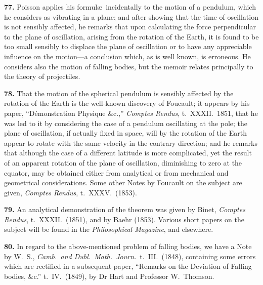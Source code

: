 \documentclass[11pt,a4paper]{article}
\theoremstyle{definition}
\begin{document}
\textbf{77.} Poisson applies his formul\ae\ incidentally to the motion of a pendulum, which he considers as vibrating in a plane; and after showing that the time of oscillation is not sensibly affected, he remarks that upon calculating the force perpendicular to the plane of oscillation, arising from the rotation of the Earth, it is found to be too small sensibly to displace the plane of oscillation or to have any appreciable influence on the motion---a conclusion which, as is well known, is erroneous. He considers also the motion of falling bodies, but the memoir relates principally to the theory of projectiles.

\textbf{78.} That the motion of the spherical pendulum is sensibly affected by the rotation of the Earth is the well-known discovery of Foucault; it appears by his paper, ``D\'emonstration Physique \&c.,'' \textit{Comptes Rendus}, t.~XXXII.~1851, that he was led to it by considering the case of a pendulum oscillating at the pole; the plane of oscillation, if actually fixed in space, will by the rotation of the Earth appear to rotate with the same velocity in the contrary direction; and he remarks that although the case of a different latitude is more complicated, yet the result of an apparent rotation of the plane of oscillation, diminishing to zero at the equator, may be obtained either from analytical or from mechanical and geometrical considerations. Some other Notes by Foucault on the subject are given, \textit{Comptes Rendus}, t.~XXXV.~(1853).

\textbf{79.} An analytical demonstration of the theorem was given by Binet, \textit{Comptes Rendus}, t.~XXXII.~(1851), and by Baehr (1853). Various short papers on the subject will be found in the \textit{Philosophical Magazine}, and elsewhere.

\textbf{80.} In regard to the above-mentioned problem of falling bodies, we have a Note by W.~S., \textit{Camb.\ and Dubl.\ Math.\ Journ.}\ t.~III.~(1848), containing some errors which are rectified in a subsequent paper, ``Remarks on the Deviation of Falling bodies, \&c.'' t.~IV.~(1849), by Dr Hart and Professor W.~Thomson.
\end{document}
